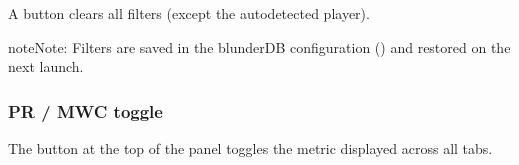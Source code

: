 \documentclass[letterpaper,10pt,english]{sphinxmanual}
\begin{document}
\sphinxAtStartPar
A  button clears all filters (except the auto\sphinxhyphen{}detected player).

\begin{sphinxadmonition}{note}{Note:}
\sphinxAtStartPar
Filters are saved in the blunderDB configuration () and restored on the next launch.
\end{sphinxadmonition}


\subsubsection{PR / MWC toggle}
\label{\detokenize{manuel:toggle-pr-mwc}}
\sphinxAtStartPar
The  button at the top of the panel toggles the metric displayed across all tabs.
\end{document}

